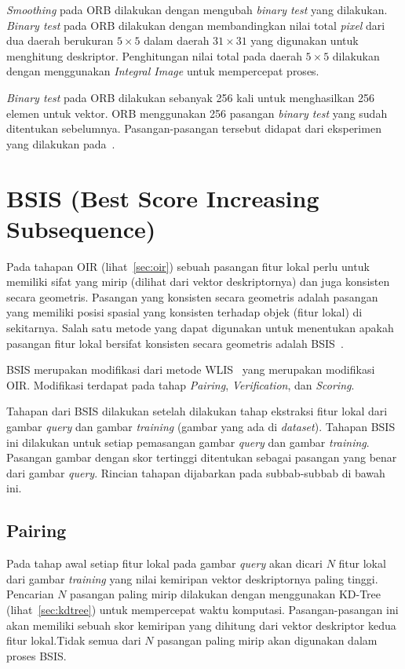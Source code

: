 \textit{Smoothing} pada ORB dilakukan dengan mengubah \textit{binary test} yang dilakukan. \textit{Binary test} pada ORB dilakukan dengan membandingkan nilai total \textit{pixel} dari dua daerah berukuran $5\times5$ dalam daerah $31\times31$ yang digunakan untuk menghitung deskriptor. Penghitungan nilai total pada daerah $5\times5$ dilakukan dengan menggunakan \textit{Integral Image} untuk mempercepat proses. 

\textit{Binary test} pada ORB dilakukan sebanyak 256 kali untuk menghasilkan 256 elemen untuk vektor. ORB menggunakan 256 pasangan \textit{binary test} yang sudah ditentukan sebelumnya. Pasangan-pasangan tersebut didapat dari eksperimen yang dilakukan pada~\cite{rublee2011orb}.

\section{BSIS (Best Score Increasing Subsequence)}
\label{sec:bsis}
Pada tahapan OIR (lihat~\ref{sec:oir}) sebuah pasangan fitur lokal perlu untuk memiliki sifat yang mirip (dilihat dari vektor deskriptornya) dan juga konsisten secara geometris. Pasangan yang konsisten secara geometris adalah pasangan yang memiliki posisi spasial yang konsisten terhadap objek (fitur lokal) di sekitarnya. Salah satu metode yang dapat digunakan untuk menentukan apakah pasangan fitur lokal bersifat konsisten secara geometris adalah BSIS~\cite{kusuma2019bsis}. 

BSIS merupakan modifikasi dari metode WLIS~\cite{kusuma2012appearance} yang merupakan modifikasi OIR. Modifikasi terdapat pada tahap \textit{Pairing}, \textit{Verification}, dan \textit{Scoring}. 

Tahapan dari BSIS dilakukan setelah dilakukan tahap ekstraksi fitur lokal dari gambar \textit{query} dan gambar \textit{training} (gambar yang ada di \textit{dataset}). Tahapan BSIS ini dilakukan untuk setiap pemasangan gambar \textit{query} dan gambar \textit{training}. Pasangan gambar dengan skor tertinggi ditentukan sebagai pasangan yang benar dari gambar \textit{query}. Rincian tahapan dijabarkan pada subbab-subbab di bawah ini. 

\subsection{Pairing}
\label{subsec:bsis_pairing}
Pada tahap awal setiap fitur lokal pada gambar \textit{query} akan dicari $N$ fitur lokal dari gambar \textit{training} yang nilai kemiripan vektor deskriptornya paling tinggi. Pencarian $N$ pasangan paling mirip dilakukan dengan menggunakan KD-Tree (lihat~\ref{sec:kdtree}) untuk mempercepat waktu komputasi. Pasangan-pasangan ini akan memiliki sebuah skor kemiripan yang dihitung dari vektor deskriptor kedua fitur lokal.Tidak semua dari $N$ pasangan paling mirip akan digunakan dalam proses BSIS. 

